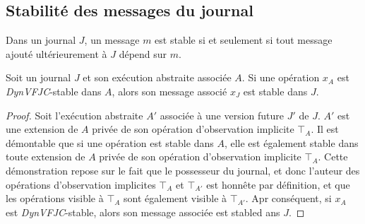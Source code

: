 %




\subsection{Stabilité des messages du journal}\label{subsec:msg-stable}

\begin{definition}
Dans un journal $J$, un message $m$ est stable si et seulement si tout message ajouté ultérieurement à $J$ dépend sur $m$.
\end{definition}

\begin{theorem}\label{th:op-msg-stable}
Soit un journal $J$ et son exécution abstraite associée $A$.
Si une opération $x_A$ est \emph{DynVFJC}-stable dans $A$, alors son message associé $x_J$ est stable dans $J$.
\end{theorem}

\begin{proof}
Soit l'exécution abstraite $A'$ associée à une version future $J'$ de $J$.
$A'$ est une extension de $A$ privée de son opération d'observation implicite $\top_A$.
Il est démontable que si une opération est stable dans $A$, elle est également stable dans toute extension de $A$ privée de son opération d'observation implicite $\top_A$.
Cette démonstration repose sur le fait que le possesseur du journal, et donc l'auteur des opérations d'observation implicites $\top_A$ et $\top_{A'}$ est honnête par définition, et que les opérations visible à $\top_A$ sont également visible à $\top_{A'}$.
Apr conséquent, si $x_A$ est \emph{DynVFJC}-stable, alors son message associée est stabled ans $J$.
\end{proof}



